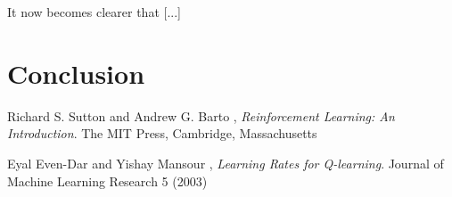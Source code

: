 \documentclass[11pt]{article}
\begin{document}
It now becomes clearer that [...]



\section{Conclusion}

\begin{thebibliography}{9}

  Richard S. Sutton and Andrew G. Barto ,
  \emph{Reinforcement Learning: An Introduction}.
  The MIT Press, Cambridge, Massachusetts

  Eyal Even-Dar and Yishay Mansour ,
  \emph{Learning Rates for Q-learning}.
  Journal of Machine Learning Research 5 (2003)

\end{thebibliography}
\end{document}
